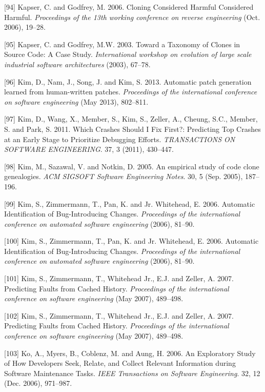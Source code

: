 \documentclass[12pt]{report}
\begin{document}
\hypertarget{ref-Kapser2006}{}
{[}94{]} Kapser, C. and Godfrey, M. 2006. Cloning Considered Harmful
Considered Harmful. \emph{Proceedings of the 13th working conference on
reverse engineering} (Oct. 2006), 19--28.

\hypertarget{ref-CoryKapser}{}
{[}95{]} Kapser, C. and Godfrey, M.W. 2003. Toward a Taxonomy of Clones
in Source Code: A Case Study. \emph{International workshop on evolution
of large scale industrial software architectures} (2003), 67--78.

\hypertarget{ref-Kim2013}{}
{[}96{]} Kim, D., Nam, J., Song, J. and Kim, S. 2013. Automatic patch
generation learned from human-written patches. \emph{Proceedings of the
international conference on software engineering} (May 2013), 802--811.

\hypertarget{ref-Kim2011c}{}
{[}97{]} Kim, D., Wang, X., Member, S., Kim, S., Zeller, A., Cheung,
S.C., Member, S. and Park, S. 2011. Which Crashes Should I Fix First?:
Predicting Top Crashes at an Early Stage to Prioritize Debugging
Efforts. \emph{TRANSACTIONS ON SOFTWARE ENGINEERING}. 37, 3 (2011),
430--447.

\hypertarget{ref-Kim2005}{}
{[}98{]} Kim, M., Sazawal, V. and Notkin, D. 2005. An empirical study of
code clone genealogies. \emph{ACM SIGSOFT Software Engineering Notes}.
30, 5 (Sep. 2005), 187--196.

\hypertarget{ref-Kim2006}{}
{[}99{]} Kim, S., Zimmermann, T., Pan, K. and Jr. Whitehead, E. 2006.
Automatic Identification of Bug-Introducing Changes. \emph{Proceedings
of the international conference on automated software engineering}
(2006), 81--90.

\hypertarget{ref-Kim2006c}{}
{[}100{]} Kim, S., Zimmermann, T., Pan, K. and Jr. Whitehead, E. 2006.
Automatic Identification of Bug-Introducing Changes. \emph{Proceedings
of the international conference on automated software engineering}
(2006), 81--90.

\hypertarget{ref-Kim2007a}{}
{[}101{]} Kim, S., Zimmermann, T., Whitehead Jr., E.J. and Zeller, A.
2007. Predicting Faults from Cached History. \emph{Proceedings of the
international conference on software engineering} (May 2007), 489--498.

\hypertarget{ref-Kim2007}{}
{[}102{]} Kim, S., Zimmermann, T., Whitehead Jr., E.J. and Zeller, A.
2007. Predicting Faults from Cached History. \emph{Proceedings of the
international conference on software engineering} (May 2007), 489--498.

\hypertarget{ref-Ko2006d}{}
{[}103{]} Ko, A., Myers, B., Coblenz, M. and Aung, H. 2006. An
Exploratory Study of How Developers Seek, Relate, and Collect Relevant
Information during Software Maintenance Tasks. \emph{IEEE Transactions
on Software Engineering}. 32, 12 (Dec. 2006), 971--987.
\end{document}
